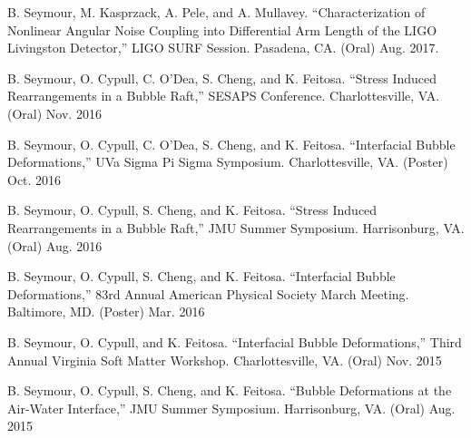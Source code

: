 \begin{cvpresentations}
  \cvpresentation
    {B. Seymour, M. Kasprzack, A. Pele, and A. Mullavey. “Characterization of Nonlinear Angular Noise Coupling into Differential Arm Length of the LIGO Livingston Detector,” LIGO SURF Session. Pasadena, CA. (Oral)} %
    {Aug. 2017.} %



  \cvpresentation
    {B. Seymour, O. Cypull, C. O’Dea, S. Cheng, and K. Feitosa. “Stress Induced Rearrangements in a Bubble Raft,” SESAPS Conference. Charlottesville, VA. (Oral)} %
    {Nov. 2016} %



  \cvpresentation
    {B. Seymour, O. Cypull, C. O’Dea, S. Cheng, and K. Feitosa. “Interfacial Bubble Deformations,” UVa Sigma Pi Sigma Symposium. Charlottesville, VA. (Poster)} %
    {Oct. 2016} %



  \cvpresentation
    {B. Seymour, O. Cypull, S. Cheng, and K. Feitosa. “Stress Induced Rearrangements in a Bubble Raft,” JMU Summer Symposium. Harrisonburg, VA. (Oral)} %
    {Aug. 2016} %



  \cvpresentation
    {B. Seymour, O. Cypull, S. Cheng, and K. Feitosa. “Interfacial Bubble Deformations,” 83rd Annual American Physical Society March Meeting. Baltimore, MD. (Poster)} %
    {Mar. 2016} %



  \cvpresentation
    {B. Seymour, O. Cypull, and K. Feitosa. “Interfacial Bubble Deformations,” Third Annual Virginia Soft Matter Workshop. Charlottesville, VA. (Oral)} %
    {Nov. 2015} %



  \cvpresentation
    {B. Seymour, O. Cypull, S. Cheng, and K. Feitosa. “Bubble Deformations at the Air-Water Interface,” JMU Summer Symposium. Harrisonburg, VA. (Oral)} %
    {Aug. 2015} %



\end{cvpresentations}
